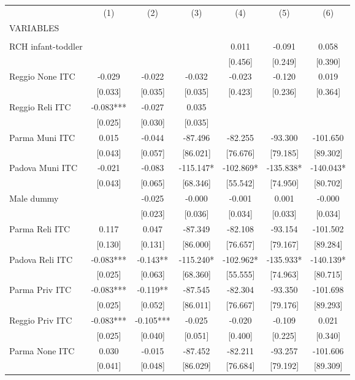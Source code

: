 \begin{tabular}{lcccccc} \hline
 & (1) & (2) & (3) & (4) & (5) & (6) \\
VARIABLES &  &  &  &  &  &  \\ \hline
 &  &  &  &  &  &  \\
RCH infant-toddler &  &  &  & 0.011 & -0.091 & 0.058 \\
 &  &  &  & [0.456] & [0.249] & [0.390] \\
Reggio None ITC & -0.029 & -0.022 & -0.032 & -0.023 & -0.120 & 0.019 \\
 & [0.033] & [0.035] & [0.035] & [0.423] & [0.236] & [0.364] \\
Reggio Reli ITC & -0.083*** & -0.027 & 0.035 &  &  &  \\
 & [0.025] & [0.030] & [0.035] &  &  &  \\
Parma Muni ITC & 0.015 & -0.044 & -87.496 & -82.255 & -93.300 & -101.650 \\
 & [0.043] & [0.057] & [86.021] & [76.676] & [79.185] & [89.302] \\
Padova Muni ITC & -0.021 & -0.083 & -115.147* & -102.869* & -135.838* & -140.043* \\
 & [0.043] & [0.065] & [68.346] & [55.542] & [74.950] & [80.702] \\
Male dummy &  & -0.025 & -0.000 & -0.001 & 0.001 & -0.000 \\
 &  & [0.023] & [0.036] & [0.034] & [0.033] & [0.034] \\
Parma Reli ITC & 0.117 & 0.047 & -87.349 & -82.108 & -93.154 & -101.502 \\
 & [0.130] & [0.131] & [86.000] & [76.657] & [79.167] & [89.284] \\
Padova Reli ITC & -0.083*** & -0.143** & -115.240* & -102.962* & -135.933* & -140.139* \\
 & [0.025] & [0.063] & [68.360] & [55.555] & [74.963] & [80.715] \\
Parma Priv ITC & -0.083*** & -0.119** & -87.545 & -82.304 & -93.350 & -101.698 \\
 & [0.025] & [0.052] & [86.011] & [76.667] & [79.176] & [89.293] \\
Reggio Priv ITC & -0.083*** & -0.105*** & -0.025 & -0.020 & -0.109 & 0.021 \\
 & [0.025] & [0.040] & [0.051] & [0.400] & [0.225] & [0.340] \\
Parma None ITC & 0.030 & -0.015 & -87.452 & -82.211 & -93.257 & -101.606 \\
 & [0.041] & [0.048] & [86.029] & [76.684] & [79.192] & [89.309] \\

\end{tabular}
